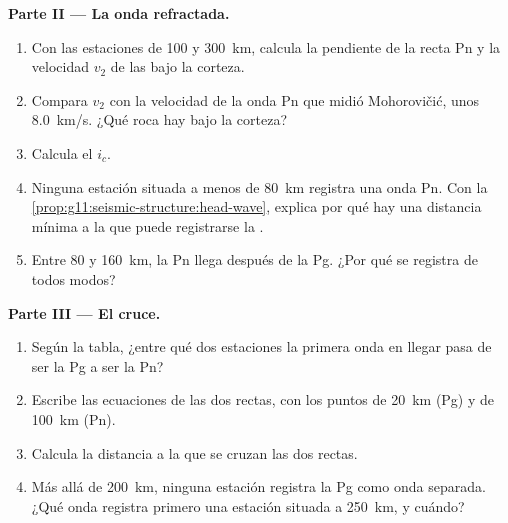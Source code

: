 \begin{problem}
\medskip
\noindent\textbf{Parte II --- La onda refractada.}
\begin{enumerate}[resume]
  \item Con las estaciones de 100 y \qty{300}{km}, calcula la pendiente de la
        recta Pn y la velocidad $v_2$ de las  bajo la corteza.
  \item Compara $v_2$ con la velocidad de la onda Pn que midió Mohorovičić,
        unos \qty{8.0}{km/s}. ¿Qué roca hay bajo la corteza?
  \item Calcula el  $i_c$.
  \item Ninguna estación situada a menos de \qty{80}{km} registra una onda Pn.
        Con la \cref{prop:g11:seismic-structure:head-wave}, explica por qué
        hay una distancia mínima a la que puede registrarse la .
  \item Entre 80 y \qty{160}{km}, la Pn llega después de la Pg. ¿Por qué se
        registra de todos modos?
\end{enumerate}

\medskip
\noindent\textbf{Parte III --- El cruce.}
\begin{enumerate}[resume]
  \item Según la tabla, ¿entre qué dos estaciones la primera onda en llegar
        pasa de ser la Pg a ser la Pn?
  \item Escribe las ecuaciones de las dos rectas, con los puntos de
        \qty{20}{km} (Pg) y de \qty{100}{km} (Pn).
  \item Calcula la distancia a la que se cruzan las dos rectas.
  \item Más allá de \qty{200}{km}, ninguna estación registra la Pg como onda
        separada. ¿Qué onda registra primero una estación situada a
        \qty{250}{km}, y cuándo?
\end{enumerate}


\end{problem}
